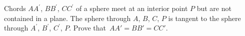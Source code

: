 Chords $AA^{\prime}$,  $BB^{\prime}$,  $CC^{\prime}$ of a sphere meet at an interior point $P$ but are not contained in a plane.  The sphere through $A$,  $B$,  $C$,  $P$ is tangent to the sphere through $A^{\prime}$,  $B^{\prime}$,  $C^{\prime}$,  $P$. Prove that $\, AA' = BB' = CC'$.